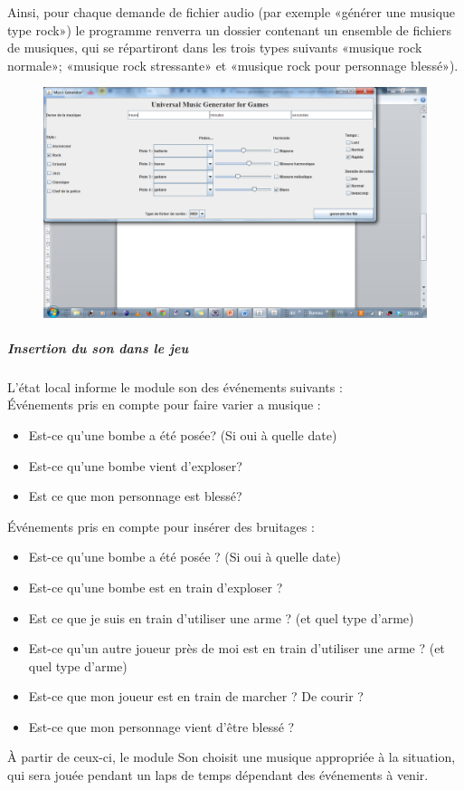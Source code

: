 \documentclass[a4paper,10pt]{article}
\begin{document}
Ainsi, pour chaque demande de fichier audio (par exemple «générer une musique type rock») le programme renverra un dossier contenant un ensemble de fichiers de musiques, qui se répartiront dans les trois types suivants «musique rock normale»; «musique rock stressante» et «musique rock pour personnage blessé»).
\begin{figure}[h]
\centering
\includegraphics[width = \linewidth]{./musique.png}
\end{figure}

\subparagraph{Insertion du son dans le jeu}

L'état local informe le module son des événements suivants : \\


Événements pris en compte pour faire varier a musique :
\begin{itemize}
\item Est-ce qu'une bombe a été posée? (Si oui à quelle date)
\item Est-ce qu'une bombe vient d'exploser?
\item Est ce que mon personnage est blessé?
\end{itemize}

Événements pris en compte pour insérer des bruitages :
\begin{itemize}
\item Est-ce qu'une bombe a été posée ? (Si oui à quelle date)
\item Est-ce qu'une bombe est en train d'exploser ?
\item Est ce que je suis en train d'utiliser une arme ? (et quel type d'arme)
\item Est-ce qu'un autre joueur près de moi est en train d'utiliser une arme ? (et quel type d'arme)
\item Est-ce que mon joueur est en train de marcher ? De courir ?
\item Est-ce que mon personnage vient d'être blessé ?

\end{itemize}
À partir de ceux-ci, le module Son choisit une musique appropriée à la situation, qui sera jouée pendant un laps de temps dépendant des événements à venir. 
\end{document}
